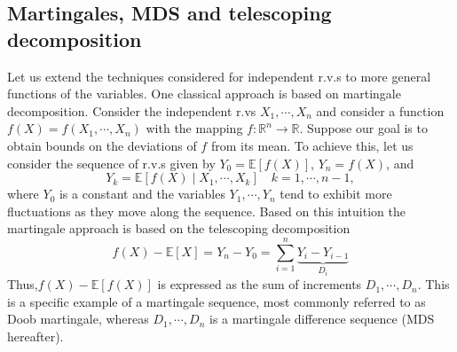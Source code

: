 \documentclass[10pt,handout,english]{beamer}
\newcommand{\E}{\mathbb{E}}
\newcommand{\R}{\mathbb{R}}
\newcommand{\1}{\mathbbm{1}}
\begin{document}
\subsection{Martingales, MDS and telescoping decomposition}

\begin{frame}[allowframebreaks]
Let us extend the techniques considered for independent r.v.s to more general functions of the variables. One classical approach is based on martingale decomposition. Consider the independent r.vs $X_1,\cdots,X_n$ and consider a function $f(X)=f(X_1,\cdots,X_n)$ with the mapping $f:\R^n\to\R$. Suppose our goal is to obtain bounds on the deviations of $f$ from its mean. To achieve this, let us consider the sequence of r.v.s given by $Y_0=\E[f(X)]$, $Y_n=f(X)$, and
\[
Y_k=\E[f(X)\mid X_1,\cdots,X_k]\quad k=1,\cdots,n-1,
\]
where $Y_0$ is a constant and the variables $Y_1,\cdots,Y_n$ tend to exhibit more fluctuations as they move along the sequence. Based on this intuition the martingale approach is based on the telescoping decomposition 
\[
f(X)-\E[X]=Y_n-Y_0=\sum\limits_{i=1}^n\underbrace{Y_i-Y_{i-1}}_{D_i}
\]
Thus,$f(X)-\E[f(X)]$ is expressed as the sum of increments $D_1,\cdots,D_n$. This is a specific example of a martingale sequence, most commonly referred to as Doob martingale, whereas $D_{1},\cdots,D_n$ is a martingale difference sequence (MDS hereafter).


\end{frame}
\end{document}
